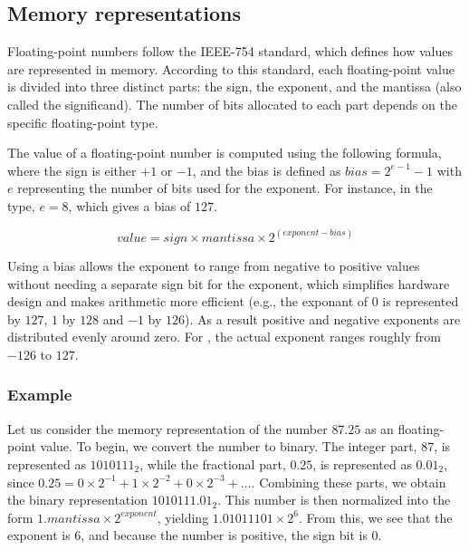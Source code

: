 \subsection{Memory representations}

Floating-point numbers follow the IEEE-754 standard, which defines how values
are represented in memory. According to this standard, each floating-point value
is divided into three distinct parts: the sign, the exponent, and the mantissa
(also called the significand). The number of bits allocated to each part depends
on the specific floating-point type.



The value of a floating-point number is computed using the following formula,
where the sign is either $+1$ or $-1$, and the bias is defined as $bias =
2^{e-1} - 1$ with $e$ representing the number of bits used for the exponent. For
instance, in the  type, $e = 8$, which gives a bias of $127$.

\begin{equation*}
  value = sign \times mantissa \times 2^{(exponent - bias)}
\end{equation*}

Using a bias allows the exponent to range from negative to positive values
without needing a separate sign bit for the exponent, which simplifies hardware
design and makes arithmetic more efficient (e.g., the exponant of $0$ is
represented by $127$, $1$ by $128$ and $-1$ by $126$). As a result positive and
negative exponents are distributed evenly around zero. For , the
actual exponent ranges roughly from $-126$ to $127$.

\subsubsection{Example}

Let us consider the memory representation of the number $87.25$ as an
 floating-point value. To begin, we convert the number to binary. The
integer part, $87$, is represented as $1010111_2$, while the fractional part,
$0.25$, is represented as $0.01_2$, since $0.25 = 0 \times 2^{-1} + 1 \times
2^{-2} + 0 \times 2^{-3} + \ldots$. Combining these parts, we obtain the binary
representation $1010111.01_2$. This number is then normalized into the form
$1.mantissa \times 2^{exponent}$, yielding $1.01011101 \times 2^{6}$. From this, we see
that the exponent is $6$, and because the number is positive, the sign bit is
$0$.



